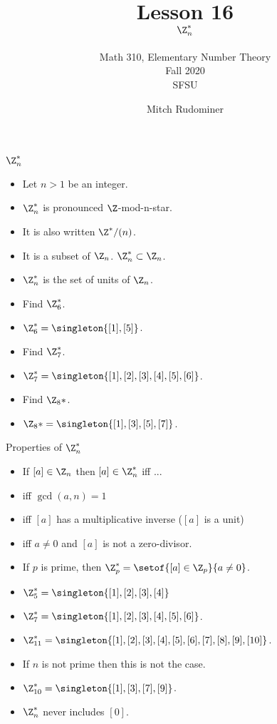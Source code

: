 \documentclass{beamer}
\title{Lesson 16 \\ $\Z_n^*$}
\subtitle{Math 310, Elementary Number Theory \\ Fall 2020 \\ SFSU}
\author{Mitch Rudominer}
\date{}
\begin{document}
\begin{frame}
  \titlepage
\end{frame}

\begin{frame}{$\Z^*_n$}

\begin{itemize}
  \item Let $n>1$ be an integer.
  \item $\Z^*_n$ is pronounced $\Z$-mod-n-star.
  \item It is also written $\Z^*/(n)$.
  \item It is a subset of $\Z_n$. $\Z_n^* \subset \Z_n$.
  \item $\Z^*_n$ is the set of units of $\Z_n$.
  \item Find $\Z_6^*$.
  \item $\Z_6^*=\singleton{[1],[5]}$.
  \item Find $\Z_7^*$.
  \item $\Z_7^*=\singleton{[1],[2],[3],[4],[5],[6]}$.
  \item Find $\Z_8*$.
  \item $\Z_8* = \singleton{[1],[3],[5],[7]}$.
\end{itemize}

\end{frame}

\begin{frame}{Properties of $\Z^*_n$}

\begin{itemize}
  \item If $[a]\in\Z_n$ then $[a]\in\Z_n^*$ iff ...
  \item iff $\gcd(a,n)=1$
  \item iff $[a]$ has a multiplicative inverse ($[a]$ is a unit)
  \item iff $a\not= 0$ and $[a]$ is not a zero-divisor.
  \item If $p$ is prime, then $\Z_p^*=\setof{[a]\in\Z_p}{a\not=0}$.
  \item $\Z_5^*=\singleton{[1],[2],[3],[4]}$
  \item $\Z_7^*=\singleton{[1],[2],[3],[4],[5],[6]}$.
  \item $\Z_{11}^*=\singleton{[1],[2],[3],[4],[5],[6],[7],[8],[9],[10]}$.
  \item If $n$ is not prime then this is not the case.
  \item $\Z_{10}^*=\singleton{[1],[3],[7],[9]}$.
  \item $\Z_n^*$ never includes $[0]$.
\end{itemize}

\end{frame}
\end{document}
